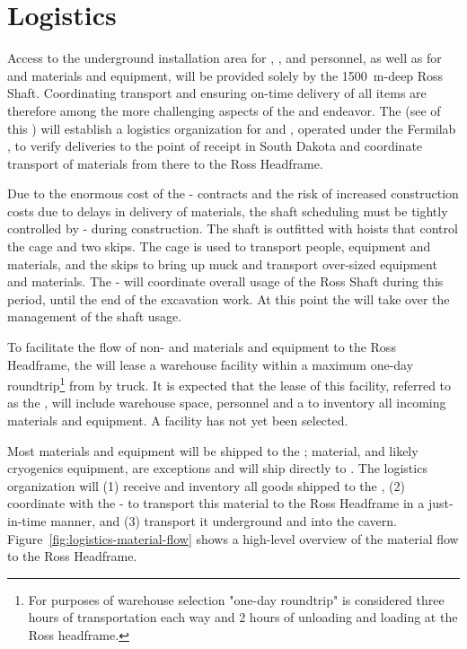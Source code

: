 \section{Logistics}
\label{sec:fdsp-tc-log}

Access to the underground installation area for ,   , and  personnel, as well as for   and   materials and equipment, will be provided solely by the \SI{1500}{m}-deep Ross Shaft. Coordinating transport and ensuring on-time delivery of all items are therefore among the more challenging aspects of the  and  endeavor. 
The  (see \tcchjpo %
of this ) will establish a logistics organization for  and , operated under the Fermilab , to verify deliveries to the point of receipt in South Dakota and coordinate transport of materials from there  to the Ross Headframe.   


Due to the enormous cost of the - contracts and the risk of increased construction costs due to delays in delivery of materials, the shaft scheduling must be tightly controlled by - during construction.
The shaft is outfitted with hoists that control the cage and two skips. The cage is used to transport people, equipment and materials, and the skips to bring up muck and transport over-sized equipment and materials. The -  will coordinate overall usage of the Ross Shaft during this period, until the end of the excavation work. At this point the  will take over the management of the shaft usage.


To facilitate the flow of non-  and  materials and equipment to the Ross Headframe, the  will lease a warehouse facility within a maximum one-day roundtrip\footnote{For purposes of warehouse selection "one-day roundtrip" is considered three hours of transportation each way and 2 hours of unloading and loading at the Ross headframe.} from  by truck. 
It is expected that the lease of this facility, referred to as the , will include warehouse space, personnel and a  to inventory all incoming materials and equipment. 
A facility has not yet been selected. 


Most materials and equipment will be shipped to the ;  material, and likely cryogenics equipment, are exceptions and will ship directly to . 
The  logistics  organization will (1) receive and inventory all  goods shipped to the , (2) coordinate with the -  to transport this material to the Ross Headframe in a just-in-time manner, and (3) transport it underground and into the cavern. 
Figure~\ref{fig:logistics-material-flow} shows a high-level overview of the material flow to the Ross Headframe.

